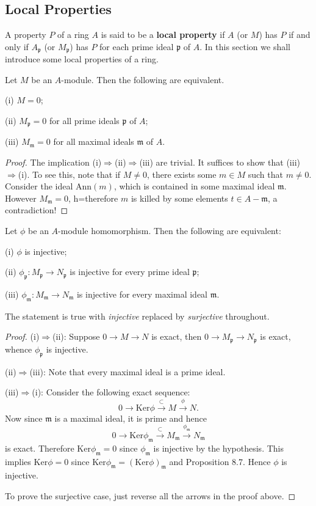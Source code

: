\subsection{Local Properties}
A property $P$ of a ring $A$ is said to be a \textbf{local property} if $A$ (or $M$) has $P$ if and only if $A_\mathfrak{p}$ (or $M_\mathfrak{p}$) has $P$ for each prime ideal $\mathfrak{p}$ of $A$. In this section we shall introduce some local properties of a ring.
\begin{proposition}
Let $M$ be an $A$-module. Then the following are equivalent.\par
(i) $M=0$;\par
(ii) $M_\mathfrak{p}=0$ for all prime ideals $\mathfrak{p}$ of $A$;\par
(iii) $M_\mathfrak{m}=0$ for all maximal ideals $\mathfrak{m}$ of $A$.
\end{proposition}
\begin{proof}
The implication (i)$\Rightarrow$(ii)$\Rightarrow$(iii) are trivial. It suffices to show that (iii)$\Rightarrow$(i). To see this, note that if $M\ne 0$, there exists some $m\in M$ such that $m\ne 0$. Consider the ideal $\mathrm{Ann}(m)$, which is contained in some maximal ideal $\mathfrak{m}$. However $M_\mathfrak{m}=0$, h=therefore $m$ is killed by some elements $t\in A-\mathfrak{m}$, a contradiction!
\end{proof}
\begin{proposition}
Let $\phi$ be an $A$-module homomorphism. Then the following are equivalent: \par
(i) $\phi$ is injective;\par
(ii) $\phi_\mathfrak{p}:M_\mathfrak{p}\to N_\mathfrak{p}$ is injective for every prime ideal $\mathfrak{p}$;\par
(iii) $\phi_\mathfrak{m}:M_\mathfrak{m}\to N_\mathfrak{m}$ is injective for every maximal ideal $\mathfrak{m}$.\par
The statement is true with \textit{injective} replaced by \textit{surjective} throughout.
\end{proposition}
\begin{proof}
(i)$\Rightarrow$(ii): Suppose $0\longrightarrow M\longrightarrow N$ is exact, then $0\longrightarrow M_\mathfrak{p}\longrightarrow N_\mathfrak{p}$ is exact, whence $\phi_\mathfrak{p}$ is injective.\par
(ii)$\Rightarrow$(iii): Note that every maximal ideal is a prime ideal.\par
(iii)$\Rightarrow$(i): Consider the following exact sequence: 
$$
0\longrightarrow \mathrm{Ker}\phi \overset{\subset}{\longrightarrow}M\overset{\phi}{\longrightarrow}N.
$$
Now since $\mathfrak{m}$ is a maximal ideal, it is prime and hence 
$$
0\longrightarrow \mathrm{Ker}\phi _{\mathfrak{m}}\overset{\subset}{\longrightarrow}M_{\mathfrak{m}}\overset{\phi _{\mathfrak{m}}}{\longrightarrow}N_{\mathfrak{m}}
$$
is exact. Therefore $\mathrm{Ker}\phi_\mathfrak{m}=0$ since $\phi_\mathfrak{m}$ is injective by the hypothesis. This implies $\mathrm{Ker}\phi=0$ since $\mathrm{Ker}\phi_\mathfrak{m}=(\mathrm{Ker}\phi)_\mathfrak{m}$ and Proposition 8.7. Hence $\phi$ is injective.\par
To prove the surjective case, just reverse all the arrows in the proof above.
\end{proof}
